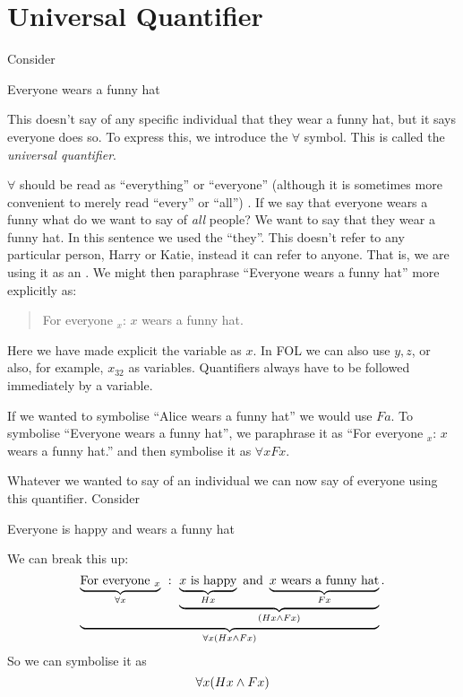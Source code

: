 \section{Universal Quantifier}

Consider
\begin{earg}
\item[\ex{q.hat}] Everyone wears a funny hat
\end{earg}
This doesn't say of any specific individual that they wear a funny hat, but it says everyone does so. To express this, we introduce the $\forall$ symbol. This is called the \emph{universal quantifier}.



$\forall$ should be read as ``everything'' or ``everyone'' (although it is sometimes more convenient to merely read ``every'' or ``all'') . If we say that everyone wears a funny what do we want to say of \emph{all} people? We want to say that they wear a funny hat. In this sentence we used the ``they''. This doesn't refer to any particular person, Harry or Katie, instead it can refer to anyone. That is, we are using it as an .
We might then paraphrase ``Everyone wears a funny hat'' more explicitly as:
\begin{quotation}
For everyone $_x$: $x$ wears a funny hat.
\end{quotation}

Here we have made explicit the variable as $x$. In FOL we can also use $y,z$, or also, for example, $x_{32}$ as variables. Quantifiers always have to be followed immediately by a variable.


If we wanted to symbolise ``Alice wears a funny hat'' we would use $Fa$. To symbolise ``Everyone wears a funny hat'', we paraphrase it as ``For everyone $_x$: $x$ wears a funny hat.'' and then symbolise it as $\forall x Fx$.


Whatever we wanted to say of an individual we can now say of everyone using this quantifier.  Consider
\begin{earg}
\item[\ex{q.hat}] Everyone is happy and wears a funny hat
\end{earg}
We can break this up:
\begin{equation*}
\underbrace{\underbrace{\text{For everyone $_x$}}_{\forall x}\ :\
 \underbrace{\underbrace{\text{$x$ is happy}}_{Hx}\text{ and }
 \underbrace{\text{$x$ wears a funny hat}}_{Fx}}_{(Hx\mathbin{\wedge} Fx)}}_{\forall x(Hx\mathbin{\wedge} Fx)}.
\end{equation*}
So we can symbolise it as $$\forall x(Hx\mathbin{\wedge} Fx)$$

